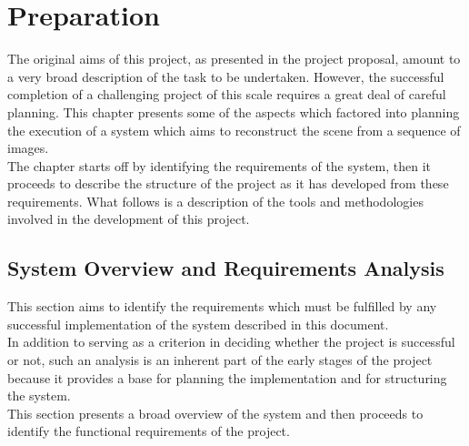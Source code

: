 \documentclass[12pt,a4paper,twoside,openright]{report}
\begin{document}
\chapter{Preparation}
The original aims of this project, as presented in the project proposal, amount to a very broad description of the task to be undertaken. However, the successful completion of a challenging project of this scale requires a great deal of careful planning. This chapter presents some of the aspects which factored into planning the execution of a system which aims to reconstruct the scene from a sequence of images.\\
\linebreak
The chapter starts off by identifying the requirements of the system, then it proceeds to describe the structure of the project as it has developed from these requirements. What follows is a description of the tools and methodologies involved in the development of this project. 


\section{System Overview and Requirements Analysis}
This section aims to identify the requirements which must be fulfilled by any successful implementation of the system described in this document.\\
In addition to serving as a criterion in deciding whether the project is successful or not, such an analysis is an inherent part of the early stages of the project because it provides a base for planning the implementation and for structuring the system.\\
\linebreak
This section presents a broad overview of the system and then proceeds to identify the functional requirements of the project.
\end{document}
